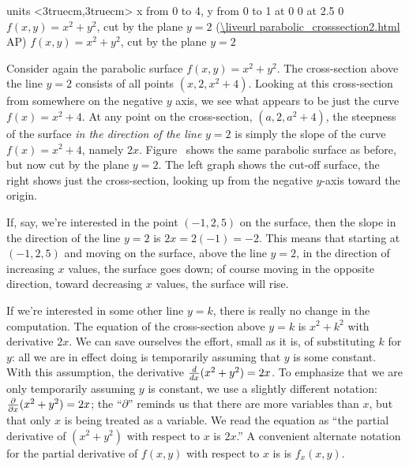 \figure
\texonly
\vbox{\beginpicture
\normalgraphs
\ninepoint
\setcoordinatesystem units <3truecm,3truecm>
\setplotarea x from 0 to 4, y from 0 to 1
 at 0 0
 at 2.5 0
\endpicture}
\begincaption
$f(x,y)=x^2 + y^2$, cut by the plane $y=2$
(\expandafter\url\expandafter{\liveurl parabolic_crosssection2.html}%
AP\endurl)
\endcaption
\endtexonly
{}
\htmlonly
\begincaption
$f(x,y)=x^2 + y^2$, cut by the plane $y=2$
\endcaption
\endhtmlonly
\endfigure

Consider again the parabolic surface $f(x,y)=x^2+y^2$. The
cross-section above the line $y=2$ consists of all points
$(x,2,x^2+4)$. Looking at this cross-section from somewhere on
the negative $y$ axis, we see what appears to be just the curve
$f(x)=x^2+4$. At any point on the cross-section, $(a,2,a^2+4)$, the
steepness of the surface {\em in the direction of the line\/} $y=2$ is
  simply the slope of the curve $f(x)=x^2+4$, namely $2x$.
Figure~ shows the same
parabolic surface as before, but now cut by the plane $y=2$. The left
graph shows the cut-off surface, the right shows just the
cross-section, looking up from the negative $y$-axis toward the
origin. 

If, say, we're interested in the point $(-1,2,5)$ on the surface, then
the slope in the direction of the line $y=2$ is $2x=2(-1)=-2$. This
means that starting at $(-1,2,5)$ and moving on the surface, above the
line $y=2$, in the direction of increasing $x$ values, the surface
goes down; of course moving in the opposite direction, toward
decreasing $x$ values, the surface will rise.

If we're interested in some other line $y=k$, there is really no
change in the computation. The equation of the cross-section above
$y=k$ is $x^2+k^2$ with derivative $2x$. We can save ourselves the
effort, small as it is, of substituting $k$ for $y$: all we are in
effect doing is temporarily assuming that $y$ is some constant. With
this assumption, the derivative ${d\over dx}(x^2+y^2)=2x$. To
emphasize that we are only temporarily assuming $y$ is constant, we
use a slightly different notation: ${\partial\over \partial
  x}(x^2+y^2)=2x$; the ``$\partial$'' reminds us that there are more
variables than $x$, but that only $x$ is being treated as a variable.
We read the equation as ``the partial derivative of $(x^2+y^2)$ with
respect to $x$ is $2x$.'' A convenient alternate notation for the
partial derivative of $f(x,y)$ with respect to $x$ is
is $f_x(x,y)$.

